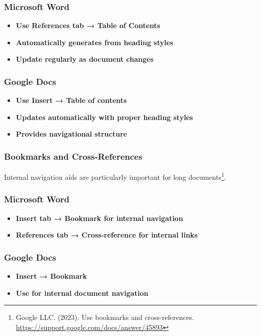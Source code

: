 \subsubsection{Microsoft Word}
\vspace{1em}
\begin{itemize}
\item \textbf{Use References tab → Table of Contents}
\item \textbf{Automatically generates from heading styles}
\item \textbf{Update regularly as document changes}
\end{itemize}
\vspace{1em}

\subsubsection{Google Docs}
\vspace{1em}
\begin{itemize}
\item \textbf{Use Insert → Table of contents}
\item \textbf{Updates automatically with proper heading styles}
\item \textbf{Provides navigational structure}
\end{itemize}
\vspace{1em}

\subsubsection{Bookmarks and Cross-References}
Internal navigation aids are particularly important for long documents\footnote{Google LLC. (2023). Use bookmarks and cross-references. \url{https://support.google.com/docs/answer/45893}}.

\subsubsection{Microsoft Word}
\vspace{1em}
\begin{itemize}
\item \textbf{Insert tab → Bookmark for internal navigation}
\item \textbf{References tab → Cross-reference for internal links}
\end{itemize}
\vspace{1em}

\subsubsection{Google Docs}
\vspace{1em}
\begin{itemize}
\item \textbf{Insert → Bookmark}
\item \textbf{Use for internal document navigation}
\end{itemize}
\vspace{1em}

